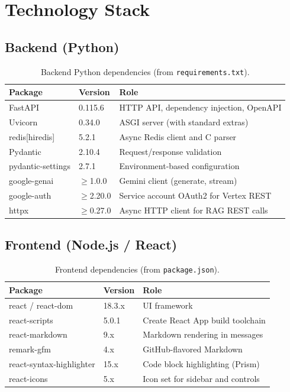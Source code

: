 \documentclass[11pt,a4paper]{article}
\begin{document}
\section{Technology Stack}

\subsection{Backend (Python)}

\begin{table}[h]
\centering
\begin{tabular}{@{}llp{7cm}@{}}
\toprule
\textbf{Package} & \textbf{Version} & \textbf{Role} \\
\midrule
FastAPI & 0.115.6 & HTTP API, dependency injection, OpenAPI \\
Uvicorn & 0.34.0 & ASGI server (with standard extras) \\
redis[hiredis] & 5.2.1 & Async Redis client and C parser \\
Pydantic & 2.10.4 & Request/response validation \\
pydantic-settings & 2.7.1 & Environment-based configuration \\
google-genai & $\geq$1.0.0 & Gemini client (generate, stream) \\
google-auth & $\geq$2.20.0 & Service account OAuth2 for Vertex REST \\
httpx & $\geq$0.27.0 & Async HTTP client for RAG REST calls \\
\bottomrule
\end{tabular}
\caption{Backend Python dependencies (from \texttt{requirements.txt}).}
\end{table}

\subsection{Frontend (Node.js / React)}

\begin{table}[h]
\centering
\begin{tabular}{@{}llp{6.5cm}@{}}
\toprule
\textbf{Package} & \textbf{Version} & \textbf{Role} \\
\midrule
react / react-dom & 18.3.x & UI framework \\
react-scripts & 5.0.1 & Create React App build toolchain \\
react-markdown & 9.x & Markdown rendering in messages \\
remark-gfm & 4.x & GitHub-flavored Markdown \\
react-syntax-highlighter & 15.x & Code block highlighting (Prism) \\
react-icons & 5.x & Icon set for sidebar and controls \\
\bottomrule
\end{tabular}
\caption{Frontend dependencies (from \texttt{package.json}).}
\end{table}
\end{document}
